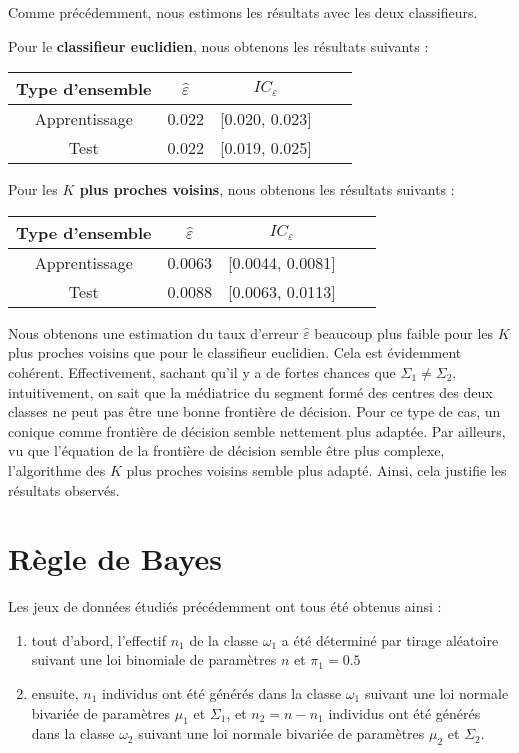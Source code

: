 \documentclass{article}
\begin{document}
\begin{multicols}{2}
Comme précédemment, nous estimons les résultats avec les deux classifieurs.

Pour le \textbf{classifieur euclidien}, nous obtenons les résultats suivants :

{\footnotesize
\begin{center}
\begin{tabular}{|c||c|c|c|c|}
\hline
Type d'ensemble & $\widehat{\varepsilon}$  & $IC_\varepsilon$  \\
\hline
\hline
Apprentissage & 0.022 & [0.020, 0.023] \\
\hline
Test & 0.022 & [0.019, 0.025] \\
\hline
\end{tabular}
\end{center}
}

Pour les \textbf{$K$ plus proches voisins}, nous obtenons les résultats suivants :

{\footnotesize
\begin{center}
\begin{tabular}{|c||c|c|c|c|}
\hline
Type d'ensemble & $\widehat{\varepsilon}$  & $IC_\varepsilon$  \\
\hline
\hline
Apprentissage & 0.0063 & [0.0044, 0.0081] \\
\hline
Test & 0.0088 & [0.0063, 0.0113] \\
\hline
\end{tabular}
\end{center}
}

Nous obtenons une estimation du taux d'erreur $\widehat{\varepsilon}$ beaucoup plus faible pour les $K$ plus proches voisins que pour le classifieur euclidien. Cela est évidemment cohérent. Effectivement, sachant qu'il y a de fortes chances que $\Sigma_1 \neq \Sigma_2,$ intuitivement, on sait que la médiatrice du segment formé des centres des deux classes ne peut pas être une bonne frontière de décision. Pour ce type de cas, un conique comme frontière de décision semble nettement plus adaptée. Par ailleurs, vu que l'équation de la frontière de décision semble être plus complexe, l'algorithme des $K$ plus proches voisins semble plus adapté. Ainsi, cela justifie les résultats observés.
\section{Règle de Bayes}
\label{sec_regle_bayes}

Les jeux de données étudiés précédemment ont tous été obtenus ainsi :

\begin{enumerate}
	\item tout d'abord, l'effectif $n_1$ de la classe $\omega_1$ a été déterminé par tirage aléatoire suivant une loi binomiale de paramètres $n$ et $\pi_1 = 0.5$
	\item ensuite, $n_1$ individus ont été générés dans la classe $\omega_1$ suivant une loi normale bivariée de paramètres $\mu_1$ et $\Sigma_1$, et $n_2 = n - n_1$ individus ont été générés dans la classe $\omega_2$ suivant une loi normale bivariée de paramètres $\mu_2$ et $\Sigma_2$.
\end{enumerate}


\end{multicols}
\end{document}
